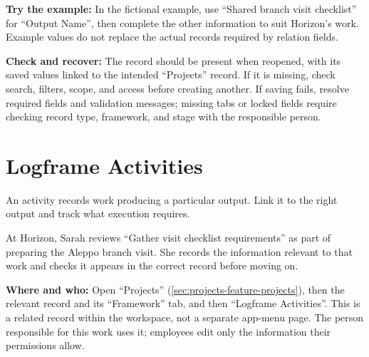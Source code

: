 \textbf{Try the example:} In the fictional example, use “Shared branch visit checklist” for “Output Name”, then complete the other information to suit Horizon's work. Example values do not replace the actual records required by relation fields.

\textbf{Check and recover:} The record should be present when reopened, with its saved values linked to the intended “Projects” record. If it is missing, check search, filters, scope, and access before creating another. If saving fails, resolve required fields and validation messages; missing tabs or locked fields require checking record type, framework, and stage with the responsible person.

\clearpage
\section{Logframe Activities}
\label{sec:projects-feature-logframe-activities}

An activity records work producing a particular output. Link it to the right output and track what execution requires.

\begin{rcnote}
At Horizon, Sarah reviews “Gather visit checklist requirements” as part of preparing the Aleppo branch visit. She records the information relevant to that work and checks it appears in the correct record before moving on.
\end{rcnote}

\textbf{Where and who:} Open “Projects” (\ref{sec:projects-feature-projects}), then the relevant record and its “Framework” tab, and then “Logframe Activities”. This is a related record within the workspace, not a separate app-menu page. The person responsible for this work uses it; employees edit only the information their permissions allow.


